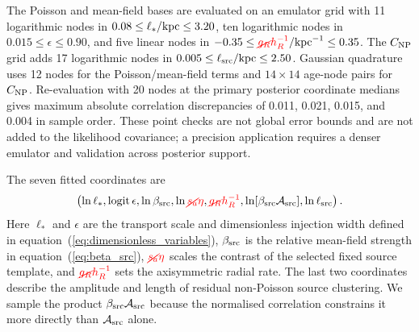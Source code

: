 \documentclass[fleqn,usenatbib]{mnras}
\newcommand{\revaddmath}[1]{\textcolor{red}{#1}}
\newcommand{\revdelmath}[1]{\textcolor{red}{\cancel{#1}}}
\begin{document}
The Poisson and mean-field bases are evaluated on an emulator grid with 11 logarithmic nodes in $0.08\leq\ell_\ast/{\rm kpc}\leq3.20$, ten logarithmic nodes in $0.015\leq\epsilon\leq0.90$, and five linear nodes in $-0.35\leq \revdelmath{g_R}\revaddmath{h_R^{-1}}/{\rm kpc}^{-1}\leq0.35$.  The $C_{\rm NP}$ grid adds 17 logarithmic nodes in $0.005\leq\ell_{\rm src}/{\rm kpc}\leq2.50$.  Gaussian quadrature uses 12 nodes for the Poisson/mean-field terms and $14\times14$ age-node pairs for $C_{\rm NP}$.  Re-evaluation with 20 nodes at the primary posterior coordinate medians gives maximum absolute correlation discrepancies of 0.011, 0.021, 0.015, and 0.004 in sample order.  These point checks are not global error bounds and are not added to the likelihood covariance; a precision application requires a denser emulator and validation across posterior support.

The seven fitted coordinates are
\begin{equation}
    \left(
    \ln\ell_\ast,
    \operatorname{logit}\epsilon,
    \ln\beta_{\rm src},
    \ln \revdelmath{s_a}\revaddmath{\eta},
    \revdelmath{g_R}\revaddmath{h_R^{-1}},
    \ln[\beta_{\rm src}{\cal A}_{\rm src}],
    \ln\ell_{\rm src}
    \right).
    \label{eq:phangs_fit_coordinates}
\end{equation}
Here $\ell_\ast$ and $\epsilon$ are the transport scale and dimensionless injection width defined in equation~(\ref{eq:dimensionless_variables}), $\beta_{\rm src}$ is the relative mean-field strength in equation~(\ref{eq:beta_src}), $\revdelmath{s_a}\revaddmath{\eta}$ scales the contrast of the selected fixed source template, and $\revdelmath{g_R}\revaddmath{h_R^{-1}}$ sets the axisymmetric radial rate.  The last two coordinates describe the amplitude and length of residual non-Poisson source clustering.  We sample the product $\beta_{\rm src}{\cal A}_{\rm src}$ because the normalised correlation constrains it more directly than ${\cal A}_{\rm src}$ alone.
\end{document}
